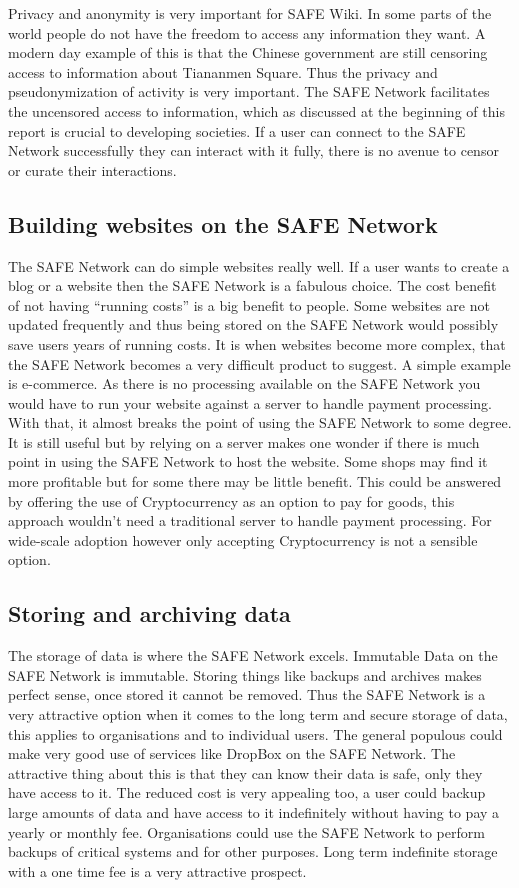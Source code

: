Privacy and anonymity is very important for SAFE Wiki. In some parts of the world people do not have the freedom to access any information they want. A modern day example of this is that the Chinese government are still censoring access to information about Tiananmen Square\cite{tiananmen-square}. Thus the privacy and pseudonymization of activity is very important. The SAFE Network facilitates the uncensored access to information, which as discussed at the beginning of this report is crucial to developing societies. If a user can connect to the SAFE Network successfully they can interact with it fully, there is no avenue to censor or curate their interactions.

\subsection{Building websites on the SAFE Network}

The SAFE Network can do simple websites really well. If a user wants to create a blog or a website then the SAFE Network is a fabulous choice. The cost benefit of not having ``running costs'' is a big benefit to people. Some websites are not updated frequently and thus being stored on the SAFE Network would possibly save users years of running costs. It is when websites become more complex, that the SAFE Network becomes a very difficult product to suggest. A simple example is e-commerce. As there is no processing available on the SAFE Network you would have to run your website against a server to handle payment processing. With that, it almost breaks the point of using the SAFE Network to some degree. It is still useful but by relying on a server makes one wonder if there is much point in using the SAFE Network to host the website. Some shops may find it more profitable but for some there may be little benefit. This could be answered by offering the use of Cryptocurrency as an option to pay for goods, this approach wouldn't need a traditional server to handle payment processing. For wide-scale adoption however only accepting Cryptocurrency is not a sensible option.

\subsection{Storing and archiving data}

The storage of data is where the SAFE Network excels. Immutable Data on the SAFE Network is immutable. Storing things like backups and archives makes perfect sense, once stored it cannot be removed. Thus the SAFE Network is a very attractive option when it comes to the long term and secure storage of data, this applies to organisations and to individual users. The general populous could make very good use of services like DropBox on the SAFE Network. The attractive thing about this is that they can know their data is safe, only they have access to it. The reduced cost is very appealing too, a user could backup large amounts of data and have access to it indefinitely without having to pay a yearly or monthly fee. Organisations could use the SAFE Network to perform backups of critical systems and for other purposes. Long term indefinite storage with a one time fee is a very attractive prospect.


